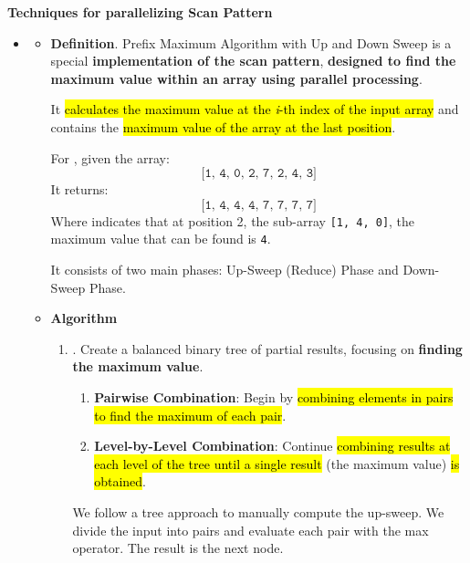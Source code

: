 \highspace
\begin{flushleft}
    \textcolor{Green3}{ \textbf{Techniques for parallelizing Scan Pattern}}
\end{flushleft}
\begin{itemize}
    \item {}
    \begin{itemize}
        \item[\textcolor{Red2}{\faIcon{book}}] \textcolor{Red2}{\textbf{Definition}}. Prefix Maximum Algorithm with Up and Down Sweep is a special \textbf{implementation of the scan pattern}, \textbf{designed to find the maximum value within an array using parallel processing}.
        
        \highspace
        It \hl{calculates the maximum value at the \emph{i}-th index of the input array} and contains the \hl{maximum value of the array at the last position}.

        \highspace
        For , given the array:
        \begin{equation*}
            \texttt{[1, 4, 0, 2, 7, 2, 4, 3]}
        \end{equation*}
        It returns:
        \begin{equation*}
            \texttt{[1, 4, 4, 4, 7, 7, 7, 7]}
        \end{equation*}
        Where indicates that at position 2, the sub-array \texttt{[1, 4, 0]}, the maximum value that can be found is \texttt{4}.

        \highspace
        It consists of two main phases: Up-Sweep (Reduce) Phase and Down-Sweep Phase.

        \item[\textcolor{Green3}{\faIcon{tools}}] \textcolor{Green3}{\textbf{Algorithm}}
        \begin{enumerate}
            \item {} . Create a balanced binary tree of partial results, focusing on \textbf{finding the maximum value}.
            \begin{enumerate}
                \item \textbf{Pairwise Combination}: Begin by \hl{combining elements in pairs to find the maximum of each pair}.
                \item \textbf{Level-by-Level Combination}: Continue \hl{combining results at each level of the tree until a single result} (the maximum value) \hl{is obtained}.
            \end{enumerate}
            \begin{examplebox}
                We follow a tree approach to manually compute the up-sweep. We divide the input into pairs and evaluate each pair with the max operator. The result is the next node.


\end{examplebox}
\end{enumerate}
\end{itemize}
\end{itemize}
